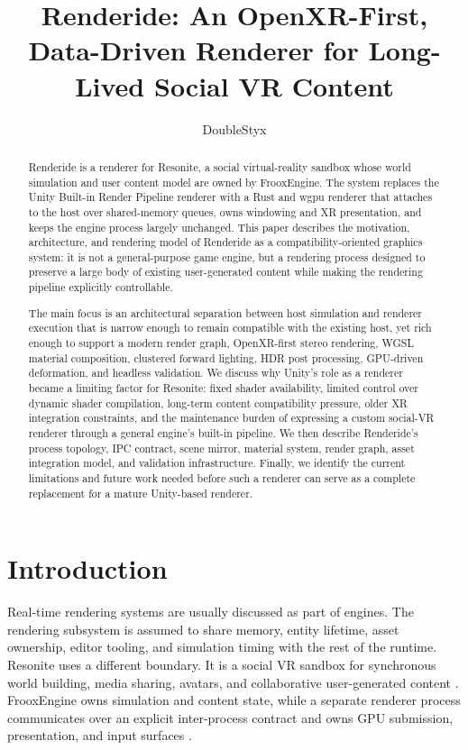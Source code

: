 \documentclass[acmtog,screen,nonacm]{acmart}
\title{Renderide: An OpenXR-First, Data-Driven Renderer for Long-Lived Social VR Content}
\author{DoubleStyx}
\begin{document}
\begin{abstract}
Renderide is a renderer for Resonite, a social virtual-reality sandbox whose world simulation and user content model are owned by FrooxEngine. The system replaces the Unity Built-in Render Pipeline renderer with a Rust and wgpu renderer that attaches to the host over shared-memory queues, owns windowing and XR presentation, and keeps the engine process largely unchanged. This paper describes the motivation, architecture, and rendering model of Renderide as a compatibility-oriented graphics system: it is not a general-purpose game engine, but a rendering process designed to preserve a large body of existing user-generated content while making the rendering pipeline explicitly controllable.

The main focus is an architectural separation between host simulation and renderer execution that is narrow enough to remain compatible with the existing host, yet rich enough to support a modern render graph, OpenXR-first stereo rendering, WGSL material composition, clustered forward lighting, HDR post processing, GPU-driven deformation, and headless validation. We discuss why Unity's role as a renderer became a limiting factor for Resonite: fixed shader availability, limited control over dynamic shader compilation, long-term content compatibility pressure, older XR integration constraints, and the maintenance burden of expressing a custom social-VR renderer through a general engine's built-in pipeline. We then describe Renderide's process topology, IPC contract, scene mirror, material system, render graph, asset integration model, and validation infrastructure. Finally, we identify the current limitations and future work needed before such a renderer can serve as a complete replacement for a mature Unity-based renderer.
\end{abstract}


\maketitle

\section{Introduction}

Real-time rendering systems are usually discussed as part of engines. The rendering subsystem is assumed to share memory, entity lifetime, asset ownership, editor tooling, and simulation timing with the rest of the runtime. Resonite uses a different boundary. It is a social VR sandbox for synchronous world building, media sharing, avatars, and collaborative user-generated content \citep{resoniteWebsite,resoniteSteam}. FrooxEngine owns simulation and content state, while a separate renderer process communicates over an explicit inter-process contract and owns GPU submission, presentation, and input surfaces \citep{resoniteWikiFrooxEngine,resonitePerformanceUpdates}.
\end{document}
